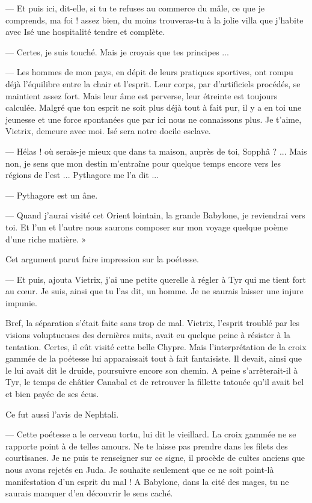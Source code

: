 \documentclass[a4paper, 11pt, oneside, polutonikogreek, french]{article}
\begin{document}
--- Et puis ici, dit-elle, si tu te refuses au commerce du mâle, ce que je comprends, ma foi ! assez bien, du moins trouveras-tu à la jolie villa que j'habite avec Isé une hospitalité tendre et complète.

--- Certes, je suis touché. Mais je croyais que tes principes ...

--- Les hommes de mon pays, en dépit de leurs pratiques sportives, ont rompu déjà l'équilibre entre la chair et l'esprit. Leur corps, par d'artificiels procédés, se maintient assez fort. Mais leur âme est perverse, leur étreinte est toujours calculée. Malgré que ton esprit ne soit plus déjà tout à fait pur, il y a en toi une jeunesse et une force spontanées que par ici nous ne connaissons plus. Je t'aime, Vietrix, demeure avec moi. Isé sera notre docile esclave.

--- Hélas ! où serais-je mieux que dans ta maison, auprès de toi, Sopphâ ? ... Mais non, je sens que mon destin m'entraîne pour quelque temps encore vers les régions de l'est ... Pythagore me l'a dit ...

--- Pythagore est un âne.

--- Quand j'aurai visité cet Orient lointain, la grande Babylone, je reviendrai vers toi. Et l'un et l'autre nous saurons composer sur mon voyage quelque poème d'une riche matière. »

Cet argument parut faire impression sur la poétesse.

--- Et puis, ajouta Vietrix, j'ai une petite querelle à régler à Tyr qui me tient fort au cœur. Je suis, ainsi que tu l'as dit, un homme. Je ne saurais laisser une injure impunie.

\bigskip
\centerline{\EightStarTaper}
\centerline{\EightStarTaper\EightStarTaper}
\bigskip

Bref, la séparation s'était faite sans trop de mal. Vietrix, l'esprit troublé par les visions voluptueuses des dernières nuits, avait eu quelque peine à résister à la tentation. Certes, il eût visité cette belle Chypre. Mais l'interprétation de la croix gammée de la poétesse lui apparaissait tout à fait fantaisiste. Il devait, ainsi que le lui avait dit le druide, poursuivre encore son chemin. A peine s'arrêterait-il à Tyr, le temps de châtier Canabal et de retrouver la fillette tatouée qu'il avait bel et bien payée de ses écus.

Ce fut aussi l'avis de Nephtali.

--- Cette poétesse a le cerveau tortu, lui dit le vieillard. La croix gammée ne se rapporte point à de telles amours. Ne te laisse pas prendre dans les filets des courtisanes. Je ne puis te renseigner sur ce signe, il procède de cultes anciens que nous avons rejetés en Juda. Je souhaite seulement que ce ne soit point-là manifestation d'un esprit du mal ! A Babylone, dans la cité des mages, tu ne saurais manquer d'en découvrir le sens caché.
\end{document}
